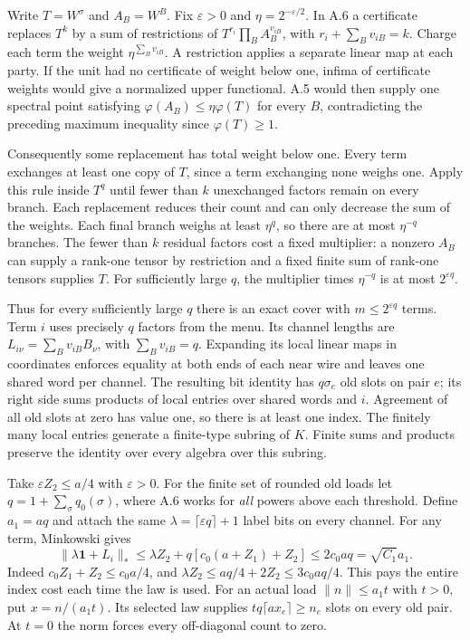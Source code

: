 Write $T=W^\sigma$ and $A_B=W^B$. Fix $\varepsilon>0$ and $\eta=2^{-\varepsilon/2}$. In A.6 a certificate replaces $T^k$ by a sum of restrictions of
$T^{r_i}\prod_B A_B^{v_{iB}}$, with $r_i+\sum_B v_{iB}=k$. Charge each term the weight $\eta^{\sum_B v_{iB}}$. A restriction applies a separate linear map at each party. If the unit had no certificate of weight below one, infima of certificate weights would give a normalized upper functional. A.5 would then supply one spectral point satisfying $\varphi(A_B)\le\eta\varphi(T)$ for every $B$, contradicting the preceding maximum inequality since $\varphi(T)\ge1$.

Consequently some replacement has total weight below one. Every term exchanges at least one copy of $T$, since a term exchanging none weighs one. Apply this rule inside $T^q$ until fewer than $k$ unexchanged factors remain on every branch. Each replacement reduces their count and can only decrease the sum of the weights. Each final branch weighs at least $\eta^q$, so there are at most $\eta^{-q}$ branches. The fewer than $k$ residual factors cost a fixed multiplier: a nonzero $A_B$ can supply a rank-one tensor by restriction and a fixed finite sum of rank-one tensors supplies $T$. For sufficiently large $q$, the multiplier times $\eta^{-q}$ is at most $2^{\varepsilon q}$.

Thus for every sufficiently large $q$ there is an exact cover with $m\le2^{\varepsilon q}$ terms. Term $i$ uses precisely $q$ factors from the menu. Its channel lengths are $L_{i\nu}=\sum_Bv_{iB}B_\nu$, with $\sum_Bv_{iB}=q$. Expanding its local linear maps in coordinates enforces equality at both ends of each near wire and leaves one shared word per channel. The resulting bit identity has $q\sigma_e$ old slots on pair $e$; its right side sums products of local entries over shared words and $i$. Agreement of all old slots at zero has value one, so there is at least one index. The finitely many local entries generate a finite-type subring of $K$. Finite sums and products preserve the identity over every algebra over this subring.


\newpage
{}
Take $\varepsilon Z_2\le a/4$ with $\varepsilon>0$. For the finite set of rounded old loads let $q=1+\sum_\sigma q_0(\sigma)$, where A.6 works for \emph{all} powers above each threshold. Define $a_1=aq$ and attach the same $\lambda=\lceil\varepsilon q\rceil+1$ label bits on every channel. For any term, Minkowski gives
\[
 \|\lambda\mathbf1+L_i\|_*
 \le\lambda Z_2+q[c_0(a+Z_1)+Z_2]\le 2c_0aq=\sqrt{C_1}a_1 .
\]
Indeed $c_0 Z_1+Z_2\le c_0a/4$, and $\lambda Z_2\le aq/4+2Z_2\le3c_0aq/4$. This pays the entire index cost each time the law is used. For an actual load $\|n\|\le a_1t$ with $t>0$, put $x=n/(a_1t)$. Its selected law supplies $tq\lceil ax_e\rceil\ge n_e$ slots on every old pair. At $t=0$ the norm forces every off-diagonal count to zero.

